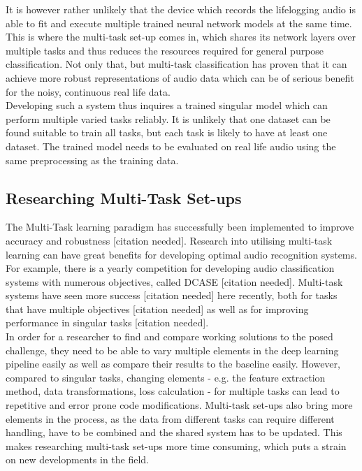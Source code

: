 It is however rather unlikely that the device which records the lifelogging audio is able to fit and execute multiple trained neural network models at the same time. This is where the multi-task set-up comes in, which shares its network layers over multiple tasks and thus reduces the resources required for general purpose classification. Not only that, but multi-task classification has proven that it can achieve more robust representations of audio data which can be of serious benefit for the noisy, continuous real life data. \\

Developing such a system thus inquires a trained singular model which can perform multiple varied tasks reliably. It is unlikely that one dataset can be found suitable to train all tasks, but each task is likely to have at least one dataset. The trained model needs to be evaluated on real life audio using the same preprocessing as the training data. \\


\subsection{Researching Multi-Task Set-ups}

The Multi-Task learning paradigm has successfully been implemented to improve accuracy and robustness [citation needed]. Research into utilising multi-task learning can have great benefits for developing optimal audio recognition systems. For example, there is a yearly competition for developing audio classification systems with numerous objectives, called DCASE [citation needed]. Multi-task systems have seen more success [citation needed] here recently, both for tasks that have multiple objectives [citation needed] as well as for improving performance in singular tasks [citation needed].\\

In order for a researcher to find and compare working solutions to the posed challenge, they need to be able to vary multiple elements in the deep learning pipeline easily as well as compare their results to the baseline easily. However, compared to singular tasks, changing elements - e.g. the feature extraction method, data transformations, loss calculation - for multiple tasks can lead to repetitive and error prone code modifications. Multi-task set-ups also bring more elements in the process, as the data from different tasks can require different handling, have to be combined and the shared system has to be updated. This makes researching multi-task set-ups more time consuming, which puts a strain on new developments in the field.\\



